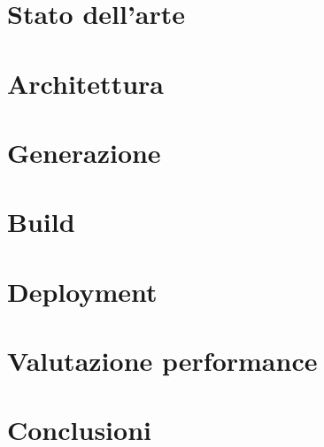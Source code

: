 \documentclass[12pt]{report}
\begin{document}
\chapter{Stato dell'arte}


\chapter{Architettura}


\chapter{Generazione}


\chapter{Build}


\chapter{Deployment}


\chapter{Valutazione performance}


\chapter{Conclusioni}


\listoffigures
\listoftables
\lstlistoflistings





\end{document}
